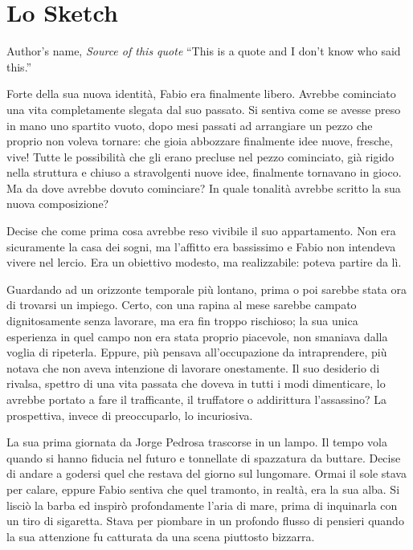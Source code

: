 \chapter{Lo Sketch}

\begin{chapquote}{Author's name, \textit{Source of this quote}}
``This is a quote and I don't know who said this.''
\end{chapquote}

Forte della sua nuova identità, Fabio era finalmente libero. Avrebbe cominciato una vita completamente slegata dal suo passato. Si sentiva come se avesse preso in mano uno spartito vuoto, dopo mesi passati ad arrangiare un pezzo che proprio non voleva tornare: che gioia abbozzare finalmente idee nuove, fresche, vive! Tutte le possibilità che gli erano precluse nel pezzo cominciato, già rigido nella struttura e chiuso a stravolgenti nuove idee, finalmente tornavano in gioco. Ma da dove avrebbe dovuto cominciare? In quale tonalità avrebbe scritto la sua nuova composizione?

Decise che come prima cosa avrebbe reso vivibile il suo appartamento. Non era sicuramente la casa dei sogni, ma l'affitto era bassissimo e Fabio non intendeva vivere nel lercio. Era un obiettivo modesto, ma realizzabile: poteva partire da lì.

Guardando ad un orizzonte temporale più lontano, prima o poi sarebbe stata ora di trovarsi un impiego. Certo, con una rapina al mese sarebbe campato dignitosamente senza lavorare, ma era fin troppo rischioso; la sua unica esperienza in quel campo non era stata proprio piacevole, non smaniava dalla voglia di ripeterla. Eppure, più pensava all'occupazione da intraprendere, più notava che non aveva intenzione di lavorare onestamente. Il suo desiderio di rivalsa, spettro di una vita passata che doveva in tutti i modi dimenticare, lo avrebbe portato a fare il trafficante, il truffatore o addirittura l'assassino? La prospettiva, invece di preoccuparlo, lo incuriosiva.

La sua prima giornata da Jorge Pedrosa trascorse in un lampo. Il tempo vola quando si hanno fiducia nel futuro e tonnellate di spazzatura da buttare. Decise di andare a godersi quel che restava del giorno sul lungomare. Ormai il sole stava per calare, eppure Fabio sentiva che quel tramonto, in realtà, era la sua alba. Si lisciò la barba ed inspirò profondamente l'aria di mare, prima di inquinarla con un tiro di sigaretta. Stava per piombare in un profondo flusso di pensieri quando la sua attenzione fu catturata da una scena piuttosto bizzarra.

